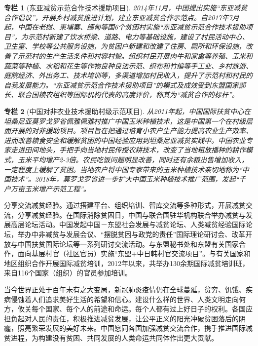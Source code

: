\documentclass{ctexart}
\newtheorem{zhuanlan}{专栏}
\begin{document}
\begin{zhuanlan}[东亚减贫示范合作技术援助项目]
    2014年11月，中国提出实施“东亚减贫合作倡议”，开展乡村减贫推进计划，建立东亚减贫合作示范点。自2017年7月起，中国在老挝、柬埔寨、缅甸等国6个贫困村实施“东亚减贫示范合作技术援助项目”，为示范村新建了饮水桥梁、道路、电力等基础设施，建设了村民活动中心、卫生室、学校等公共服务设施，为贫困户新建和改建了住房、厕所和环保设施，改善了示范村的生产生活条件和村容村貌。组织村民开展肉牛和家禽等养殖、玉米和蔬菜等种植、水稻和花生等作物良种良法示范、织布和竹编等手工业、乡村旅游、庭院经济、外出务工、技术培训等，多渠道增加村民收入，提升了示范村和村民的自我发展能力。“东亚减贫示范合作技术援助项目”的模式及成效受到东盟国家部长、联合国粮农组织等国际机构代表的高度评价，称其为“减贫合作的标杆”。
    \label{col-17}
\end{zhuanlan}

\begin{zhuanlan}[中国对非农业技术援助村级示范项目]
    从2011年起，中国国际扶贫中心在坦桑尼亚莫罗戈罗省佩雅佩雅村推广中国玉米种植技术，这是中国第一个在村级层面开展的对非援助项目。项目旨在把通过培育小农户生产能力提高农业生产效率、进而改善粮食安全和缓解贫困的中国经验应用到坦桑尼亚减贫实践中。中国农业专家走进田间地头，手把手向当地村民传授农耕技术，改变了当地粗放播种的耕作模式，玉米平均增产2-3倍。农民吃饭问题明显改善，同时还有余粮出售增加收入，一定程度上缓解了贫困。当地农户将中国专家带来的玉米种植技术亲切地称为“中国技术”。2018年，莫罗戈罗省进一步扩大中国玉米种植技术推广范围，发起“千户万亩玉米增产示范工程”。
    \label{col-18}
\end{zhuanlan}

分享交流减贫经验。通过搭建平台、组织培训、智库交流等多种形式，开展减贫交流，分享减贫经验。在国际消除贫困日，中国与联合国驻华机构联合举办减贫与发展高层论坛活动。中国发起中国－东盟社会发展与减贫论坛、人类减贫经验国际论坛，举办中非减贫与发展会议、“摆脱贫困与政党的责任”国际理论研讨会、改革开放与中国扶贫国际论坛等一系列研讨交流活动。与东盟秘书处和东盟有关国家合作，面向基层村官（社区官员）实施“东盟+中日韩村官交流项目”。与有关国家和地区组织合作开展国际减贫培训，2012年以来，共举办130余期国际减贫培训班，来自116个国家（组织）的官员参加培训。

当今世界正处于百年未有之大变局，新冠肺炎疫情仍在全球蔓延，贫穷、饥饿、疾病侵蚀着人们追求美好生活的希望和信心。建设什么样的世界、人类文明走向何方，攸关每个国家、每个人的前途和命运。每个人都有过上好日子的权利。各国应担负起对人民的责任，积极推进减贫发展，让公平正义的阳光冲破贫困落后的阴霾，照亮繁荣发展的美好未来。中国愿同各国加强减贫交流合作，携手推进国际减贫进程，为构建没有贫困、共同发展的人类命运共同体作出更大贡献。
\end{document}
